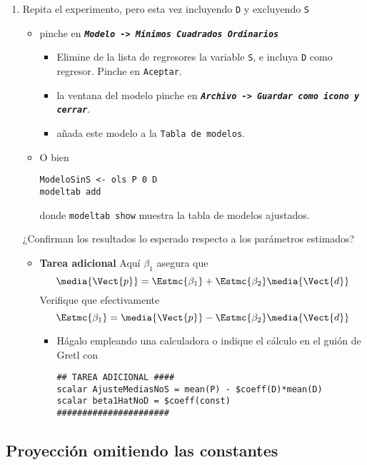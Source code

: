 \documentclass[11pt]{article}
\begin{document}
\begin{enumerate}
\item Repita el experimento, pero esta vez incluyendo \texttt{D} y excluyendo \texttt{S}

\begin{itemize}
\item pinche en \textbf{\emph{\texttt{Modelo -> Mínimos Cuadrados Ordinarios}}}

\begin{itemize}
\item Elimine de la lista de regresores la variable \texttt{S}, e incluya \texttt{D} como regresor. Pinche en \texttt{Aceptar}.

\item la ventana del modelo pinche en \textbf{\emph{\texttt{Archivo -> Guardar como icono y cerrar}}}.

\item añada este modelo a la \texttt{Tabla de modelos}.
\end{itemize}

\item O bien 
\begin{verbatim}
ModeloSinS <- ols P 0 D
modeltab add
\end{verbatim}
donde \texttt{modeltab show} muestra la tabla de modelos ajustados.
\end{itemize}

¿Confirman los resultados lo esperado respecto a los parámetros estimados?

\begin{itemize}
\item \textbf{Tarea adicional} Aquí \(\beta_1\) asegura que
\[\media{\Vect{p}}=\Estmc{\beta_1}+\Estmc{\beta_2}\media{\Vect{d}}\]
Verifique que efectivamente
\[\Estmc{\beta_1}=\media{\Vect{p}}-\Estmc{\beta_2}\media{\Vect{d}}\]

\begin{itemize}
\item Hágalo empleando una calculadora o indique el cálculo en el guión de Gretl con
\begin{verbatim}
## TAREA ADICIONAL ####
scalar AjusteMediasNoS = mean(P) - $coeff(D)*mean(D)
scalar beta1HatNoD = $coeff(const)
######################	 
\end{verbatim}
\end{itemize}
\end{itemize}
\end{enumerate}

\subsection{Proyección omitiendo las constantes}
\label{sec:orge76fe4b}
\end{document}
